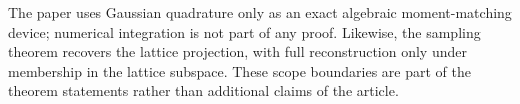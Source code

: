 The paper uses Gaussian quadrature only as an exact algebraic moment-matching
device; numerical integration is not part of any proof.  Likewise, the
sampling theorem recovers the lattice projection, with full reconstruction
only under membership in the lattice subspace.  These scope boundaries are
part of the theorem statements rather than additional claims of the article.

